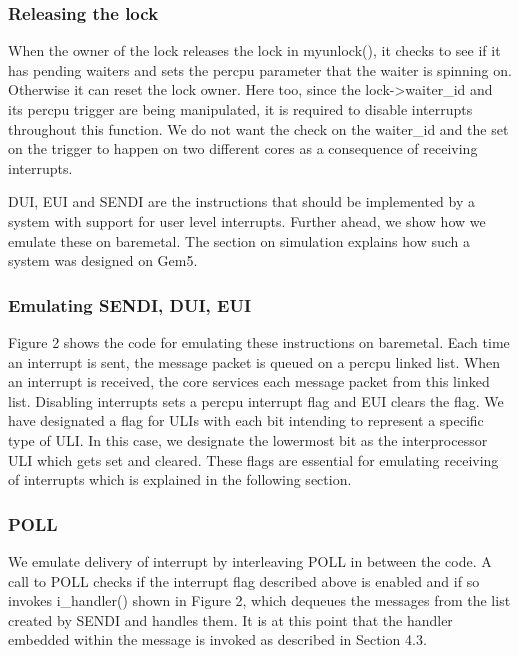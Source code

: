 \subsubsection{Releasing the lock}

When the owner of the lock releases the lock in myunlock(), it checks to see if
it has pending waiters and sets the percpu parameter that the waiter is spinning
on. Otherwise it can reset the lock owner. Here too, since the lock->waiter\_id
and its percpu trigger are being manipulated, it is required to disable
interrupts throughout this function. We do not want the check on the waiter\_id
and the set on the trigger to happen on two different cores as a consequence of
receiving interrupts.

DUI, EUI and SENDI are the instructions that should be implemented by a system
with support for user level interrupts. Further ahead, we show how we emulate
these on baremetal. The section on simulation explains how such a system was
designed on Gem5.

\subsubsection{Emulating SENDI, DUI, EUI}

Figure 2 shows the code for emulating these instructions on baremetal. Each time
an interrupt is sent, the message packet is queued on a percpu linked list. When
an interrupt is received, the core services each message packet from this linked
list. Disabling interrupts sets a percpu interrupt flag and EUI clears the flag.
We have designated a flag for ULIs with each bit intending to represent a
specific type of ULI.  In this case, we designate the lowermost bit as the
interprocessor ULI which gets set and cleared. These flags are essential for
emulating receiving of interrupts which is explained in the following section.

\subsubsection{POLL}

We emulate delivery of interrupt by interleaving POLL in between the code. A
call to POLL checks if the interrupt flag described above is enabled and if so
invokes i\_handler() shown in Figure 2, which dequeues the messages from the list
created by SENDI and handles them.  It is at this point that the handler
embedded within the message is invoked as described in Section 4.3.

